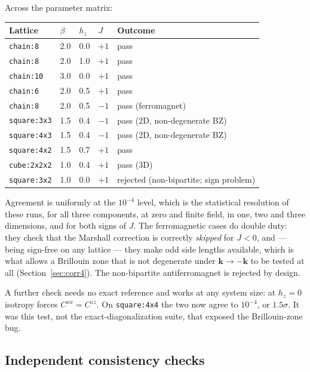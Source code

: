 \documentclass[11pt,a4paper]{article}
\newcommand{\code}[1]{\texttt{#1}}
\begin{document}
Across the parameter matrix:

\begin{center}
\begin{tabular}{lllll}
\toprule
Lattice & $\beta$ & $h_z$ & $J$ & Outcome \\
\midrule
\code{chain:8}     & 2.0 & 0.0 & $+1$ & pass \\
\code{chain:8}     & 2.0 & 1.0 & $+1$ & pass \\
\code{chain:10}    & 3.0 & 0.0 & $+1$ & pass \\
\code{chain:6}     & 2.0 & 0.5 & $+1$ & pass \\
\code{chain:8}     & 2.0 & 0.5 & $-1$ & pass (ferromagnet) \\
\code{square:3x3}  & 1.5 & 0.4 & $-1$ & pass (2D, non-degenerate BZ) \\
\code{square:4x3}  & 1.5 & 0.4 & $-1$ & pass (2D, non-degenerate BZ) \\
\code{square:4x2}  & 1.5 & 0.7 & $+1$ & pass \\
\code{cube:2x2x2}  & 1.0 & 0.4 & $+1$ & pass (3D) \\
\code{square:3x2}  & 1.0 & 0.0 & $+1$ & rejected (non-bipartite; sign problem) \\
\bottomrule
\end{tabular}
\end{center}

Agreement is uniformly at the $10^{-4}$ level, which is the statistical
resolution of these runs, for all three components, at zero and finite field, in
one, two and three dimensions, and for both signs of $J$. The ferromagnetic
cases do double duty: they check that the Marshall correction is correctly
\emph{skipped} for $J<0$, and --- being sign-free on any lattice --- they make
odd side lengths available, which is what allows a Brillouin zone that is not
degenerate under $\mathbf{k}\to-\mathbf{k}$ to be tested at all
(Section~\ref{sec:corr4}). The non-bipartite antiferromagnet is rejected by
design.

A further check needs no exact reference and works at any system size: at
$h_z=0$ isotropy forces $C^{xx}=C^{zz}$. On \code{square:4x4} the two now agree
to $10^{-4}$, or $1.5\sigma$. It was this test, not the exact-diagonalization
suite, that exposed the Brillouin-zone bug.

\subsection{Independent consistency checks}
\end{document}
